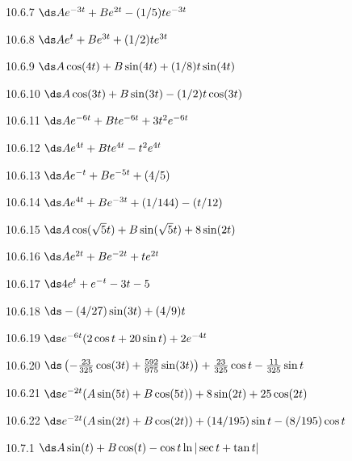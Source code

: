 \begin{Answer}{10.6.7}
 $\ds Ae^{-3t}+Be^{2t}-(1/5)te^{-3t}$
\end{Answer}
\begin{Answer}{10.6.8}
 $\ds Ae^t+Be^{3t}+(1/2)te^{3t}$
\end{Answer}
\begin{Answer}{10.6.9}
 $\ds A\cos(4t)+B\sin(4t)+(1/8)t\sin(4t)$
\end{Answer}
\begin{Answer}{10.6.10}
 $\ds A\cos(3t)+B\sin(3t)-(1/2)t\cos(3t)$
\end{Answer}
\begin{Answer}{10.6.11}
 $\ds Ae^{-6t}+Bte^{-6t}+3t^2e^{-6t}$
\end{Answer}
\begin{Answer}{10.6.12}
 $\ds Ae^{4t}+Bte^{4t}-t^2e^{4t}$
\end{Answer}
\begin{Answer}{10.6.13}
 $\ds Ae^{-t}+Be^{-5t}+(4/5)$
\end{Answer}
\begin{Answer}{10.6.14}
 $\ds Ae^{4t}+Be^{-3t}+(1/144)-(t/12)$
\end{Answer}
\begin{Answer}{10.6.15}
 $\ds A\cos(\sqrt5t)+B\sin(\sqrt5t)+8\sin(2t)$
\end{Answer}
\begin{Answer}{10.6.16}
 $\ds Ae^{2t}+Be^{-2t}+te^{2t}$
\end{Answer}
\begin{Answer}{10.6.17}
 $\ds 4e^{t}+e^{-t}-3t-5$
\end{Answer}
\begin{Answer}{10.6.18}
 $\ds -(4/27)\sin(3t)+(4/9)t$
\end{Answer}
\begin{Answer}{10.6.19}
 $\ds e^{-6t}(2\cos t+20\sin t)+2e^{-4t}$
\end{Answer}
\begin{Answer}{10.6.20}
 $\ds
\left(-{23\over 325}\cos(3t)+{592\over 975}\sin(3t)\right)+
{23\over325}\cos t-{11\over325}\sin t$
\end{Answer}
\begin{Answer}{10.6.21}
 $\ds e^{-2t}(A\sin(5t)+B\cos(5t))+8\sin(2t)+25\cos(2t)$
\end{Answer}
\begin{Answer}{10.6.22}
 $\ds e^{-2t}(A\sin(2t)+B\cos(2t))+(14/195)\sin t-(8/195)\cos t$
\end{Answer}
\begin{Answer}{10.7.1}
 $\ds A\sin(t)+B\cos(t)-\hfill\break\cos t\ln|\sec t+\tan t|$
\end{Answer}
